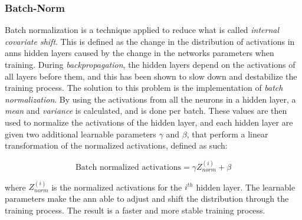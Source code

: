 \subsubsection{Batch-Norm}
    Batch normalization is a technique applied to reduce what is called \textit{internal  covariate shift}\cite{pmlr-v37-ioffe15_batch_norm}. This is defined as the change in the distribution of activations in \gls{ann}s hidden layers caused by the change in the networks parameters when training. During \textit{backpropagation}, the hidden layers depend on the activations of all layers before them, and this has been shown to slow down and destabilize the training process. The solution to this problem is the implementation of \textit{batch normalization}. By using the activations from all the neurons in a hidden layer, a \textit{mean} and \textit{variance} is calculated, and is done per batch. These values are then used to normalize the activations of the hidden layer, and each hidden layer are given two additional learnable parameters $\gamma$ and $\beta$, that perform a linear transformation of the normalized activations, defined as such:
    
        \begin{equation} \label{batch_normalization}
            \textrm{Batch normalized activations} =   \gamma Z^{(i)}_{norm} + \beta
        \end{equation}
    
    where $Z^{(i)}_{norm}$ is the normalized activations for the $i^{th}$ hidden layer. The learnable parameters make the \gls{ann} able to adjust and shift the distribution through the training process. The result is a faster and more stable training process. 

